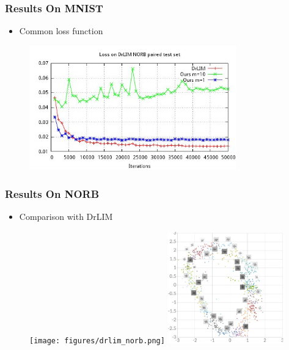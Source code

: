 \documentclass[10pt]{beamer}
\begin{document}
\begin{frame}
    \frametitle{Results On MNIST}
    \begin{itemize}
        \item Common loss function
    \end{itemize}

    \begin{figure}[h]
        \begin{center}
            \includegraphics[width=0.8\textwidth]{../report/thesis_figures/final_loss_testv3.jpg}
        \end{center}
    \end{figure}
\end{frame}


\begin{frame}
    \frametitle{Results On NORB}
    \begin{itemize}
        \item Comparison with DrLIM
    \end{itemize}


    \begin{figure}[h]
        \begin{center}
            \texttt{[image: figures/drlim\_norb.png]}
            \vspace{1cm}
            \includegraphics[width=0.45\textwidth]{../report/thesis_figures/norb_cl2d.jpg}
        \end{center}
    \end{figure}
\end{frame}
\end{document}
